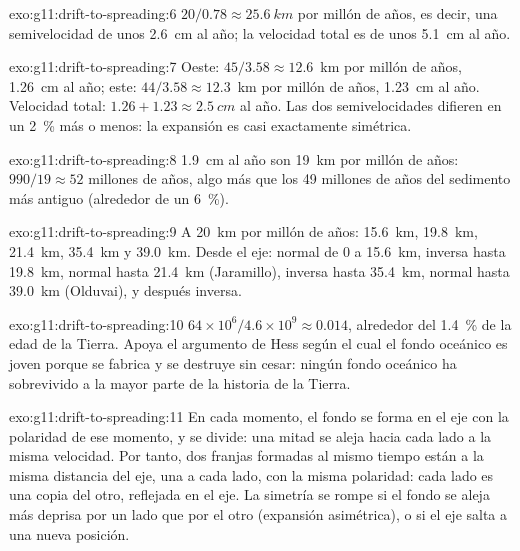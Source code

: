 \begin{solution}{exo:g11:drift-to-spreading:6}
$20/0.78 \approx \qty{25.6}{km}$ por millón de años, es decir, una
semivelocidad de unos \qty{2.6}{cm} al año; la velocidad total es de unos
\qty{5.1}{cm} al año.
\end{solution}

\begin{solution}{exo:g11:drift-to-spreading:7}
Oeste: $45/3.58 \approx 12.6$~km por millón de años, \qty{1.26}{cm} al año;
este: $44/3.58 \approx 12.3$~km por millón de años, \qty{1.23}{cm} al año.
Velocidad total: $1.26 + 1.23 \approx \qty{2.5}{cm}$ al año. Las dos
semivelocidades difieren en un \qty{2}{\percent} más o menos: la expansión es
casi exactamente simétrica.
\end{solution}

\begin{solution}{exo:g11:drift-to-spreading:8}
\qty{1.9}{cm} al año son \qty{19}{km} por millón de años: $990/19 \approx 52$
millones de años, algo más que los 49 millones de años del sedimento más
antiguo (alrededor de un \qty{6}{\percent}).
\end{solution}

\begin{solution}{exo:g11:drift-to-spreading:9}
A \qty{20}{km} por millón de años: \qty{15.6}{km}, \qty{19.8}{km},
\qty{21.4}{km}, \qty{35.4}{km} y \qty{39.0}{km}. Desde el eje: normal de 0
a \qty{15.6}{km}, inversa hasta \qty{19.8}{km}, normal hasta \qty{21.4}{km}
(Jaramillo), inversa hasta \qty{35.4}{km}, normal hasta \qty{39.0}{km}
(Olduvai), y después inversa.
\end{solution}

\begin{solution}{exo:g11:drift-to-spreading:10}
$64 \times 10^6/4.6 \times 10^9 \approx \num{0.014}$, alrededor del
\qty{1.4}{\percent} de la edad de la Tierra. Apoya el argumento de Hess según
el cual el fondo oceánico es joven porque se fabrica y se destruye sin cesar:
ningún fondo oceánico ha sobrevivido a la mayor parte de la historia de la
Tierra.
\end{solution}

\begin{solution}{exo:g11:drift-to-spreading:11}
En cada momento, el fondo se forma en el eje con la polaridad de ese momento,
y se divide: una mitad se aleja hacia cada lado a la misma velocidad. Por
tanto, dos franjas formadas al mismo tiempo están a la misma distancia del
eje, una a cada lado, con la misma polaridad: cada lado es una copia del
otro, reflejada en el eje. La simetría se rompe si el fondo se aleja más
deprisa por un lado que por el otro (expansión asimétrica), o si el eje salta
a una nueva posición.
\end{solution}

